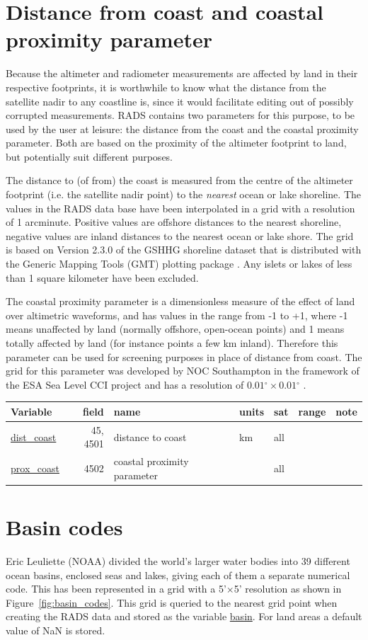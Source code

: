 \documentclass[a4paper,11pt,openany,natbib,nomargin]{thesis}
\makeatletter
\renewcommand\deg{\ensuremath{^\circ}}
\newcommand\var[1]{\url{#1}\index{variables!#1@\protect\url{#1}}}
\newenvironment{vartable}{
\begin{table}[ht]
\small
\begin{tabular}{lrllllr}
\hline
Variable & field & name & units & sat & range & note \\
\hline
}{
\hline
\end{tabular}
\end{table}
}
\makeatother
\begin{document}
\section{Distance from coast and coastal proximity parameter}

Because the altimeter and radiometer measurements are affected by land in their respective footprints, it is worthwhile to know what the distance from the satellite nadir to any coastline is, since it would facilitate editing out of possibly corrupted measurements. RADS contains two parameters for this purpose, to be used by the user at leisure: the distance from the coast and the coastal proximity parameter. Both are based on the proximity of the altimeter footprint to land, but potentially suit different purposes.

The distance to (of from) the coast is measured from the centre of the altimeter footprint (i.e. the satellite nadir point) to the \emph{nearest} ocean or lake shoreline. The values in the RADS data base have been interpolated in a grid with a resolution of 1 arc\-minute. Positive values are offshore distances to the nearest shoreline, negative values are inland distances to the nearest ocean or lake shore. The grid is based on Version 2.3.0 of the GSHHG shoreline dataset \citep{wessel1996} that is distributed with the Generic Mapping Tools (GMT) plotting package \citep{wessel2013}. Any islets or lakes of less than 1 square kilometer have been excluded.

The coastal proximity parameter is a dimensionless measure of the effect of land over altimetric waveforms, and has values in the range from -1 to +1, where -1 means unaffected by land (normally offshore, open-ocean points) and 1 means totally affected by land (for instance points a few km inland). Therefore this parameter can be used for screening purposes in place of distance from coast. The grid for this parameter was developed by NOC Southampton in the framework of the ESA Sea Level CCI project and has a resolution of $0.01\deg\times0.01\deg$ \citep{cipollini2011}.

\begin{vartable}
\var{dist_coast} & 45, 4501 & distance to coast & km & all && \\
\var{prox_coast} & 4502 & coastal proximity parameter && all && \\
\end{vartable}

\section{Basin codes}
Eric Leuliette (NOAA) divided the world's larger water bodies into 39 different ocean basins, enclosed seas and lakes, giving each of them a separate numerical code. This has been represented in a grid with a 5'$\times$5' resolution as shown in Figure~\ref{fig:basin_codes}. This grid is queried to the nearest grid point when creating the RADS data and stored as the variable \var{basin}. For land areas a default value of NaN is stored.
\end{document}
